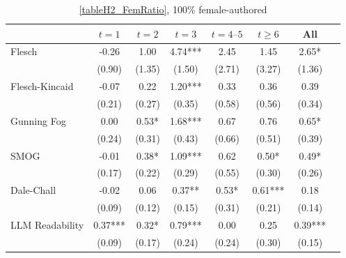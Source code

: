 \begin{table}
    \footnotesize
    \centering
    \begin{threeparttable}
        \caption{\autoref{tableH2_FemRatio}, 100\% female-authored}
        \label{tableH2_Fem100}
        \begin{tabular}{p{3cm}S@{}S@{}S@{}S@{}S@{}S@{}S@{}}
            \toprule
            &{\(t=1\)}&{\(t=2\)}&{\(t=3\)}&{\(t=4\text{--}5\)}&{\(t\ge6\)}&{All}\\
            \midrule
            Flesch                        &       -0.26   &        1.00   &        4.74***&        2.45   &        1.45   &        2.65*  \\
                                          &      (0.90)   &      (1.35)   &      (1.50)   &      (2.71)   &      (3.27)   &      (1.36)   \\
            Flesch-Kincaid                &       -0.07   &        0.22   &        1.20***&        0.33   &        0.36   &        0.39   \\
                                          &      (0.21)   &      (0.27)   &      (0.35)   &      (0.58)   &      (0.56)   &      (0.34)   \\
            Gunning Fog                   &        0.00   &        0.53*  &        1.68***&        0.67   &        0.76   &        0.65*  \\
                                          &      (0.24)   &      (0.31)   &      (0.43)   &      (0.66)   &      (0.51)   &      (0.39)   \\
            SMOG                          &       -0.01   &        0.38*  &        1.09***&        0.62   &        0.50*  &        0.49*  \\
                                          &      (0.17)   &      (0.22)   &      (0.29)   &      (0.55)   &      (0.30)   &      (0.26)   \\
            Dale-Chall                    &       -0.02   &        0.06   &        0.37** &        0.53*  &        0.61***&        0.18   \\
                                          &      (0.09)   &      (0.12)   &      (0.15)   &      (0.31)   &      (0.21)   &      (0.14)   \\
            LLM Readability               &        0.37***&        0.32*  &        0.79***&        0.00   &        0.25   &        0.39***\\
                                          &      (0.09)   &      (0.17)   &      (0.24)   &      (0.24)   &      (0.30)   &      (0.15)   \\

\end{tabular}
\end{threeparttable}
\end{table}

